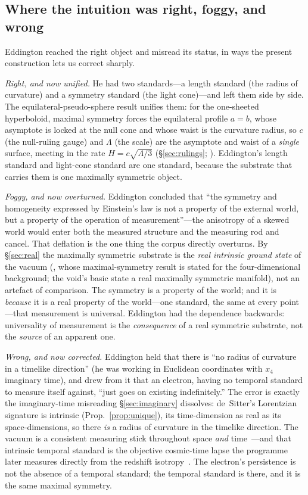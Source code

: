 \documentclass[11pt,a4paper]{article}
\theoremstyle{definition}
\begin{document}
\subsection{Where the intuition was right, foggy, and wrong}

Eddington reached the right object and misread its status, in ways the
present construction lets us correct sharply.

\emph{Right, and now unified.} He had two standards---a length standard (the
radius of curvature) and a symmetry standard (the light cone)---and left
them side by side. The equilateral-pseudo-sphere result unifies them: for
the one-sheeted hyperboloid, maximal symmetry forces the equilateral
profile $a=b$, whose asymptote is locked at the null cone and whose waist is
the curvature radius, so $c$ (the null-ruling gauge) and $\Lambda$ (the
scale) are the asymptote and waist of a \emph{single} surface, meeting in
the rate $H=c\sqrt{\Lambda/3}$ (\S\ref{sec:rulings};
\cite{JanzenCRframework}). Eddington's length standard and light-cone standard
are one standard, because the substrate that carries them is one
maximally symmetric object.

\emph{Foggy, and now overturned.} Eddington concluded that ``the symmetry
and homogeneity expressed by Einstein's law is not a property of the
external world, but a property of the operation of measurement''---the
anisotropy of a skewed world would enter both the measured structure and
the measuring rod and cancel. That deflation is the one thing the corpus
directly overturns. By \S\ref{sec:real} the maximally symmetric substrate
is the \emph{real intrinsic ground state} of the vacuum
(\cite{JanzenThesis}, whose maximal-symmetry result is stated for the
four-dimensional background; the void's basic state a real maximally
symmetric manifold), not an artefact of comparison. The symmetry
is a property of the world; and it is \emph{because} it is a real property
of the world---one standard, the same at every point---that measurement is
universal. Eddington had the dependence backwards: universality of
measurement is the \emph{consequence} of a real symmetric substrate, not the
\emph{source} of an apparent one.

\emph{Wrong, and now corrected.} Eddington held that there is ``no radius of
curvature in a timelike direction'' (he was working in Euclidean
coordinates with $x_4$ imaginary time), and drew from it that an electron,
having no temporal standard to measure itself against, ``just goes on
existing indefinitely.'' The error is exactly the imaginary-time misreading
\S\ref{sec:imaginary} dissolves: de~Sitter's Lorentzian signature is
intrinsic (Prop.~\ref{prop:unique}), its time-dimension as real as its
space-dimensions, so there \emph{is} a radius of curvature in the timelike
direction. The vacuum is a consistent measuring stick throughout space
\emph{and} time~\cite{JanzenThesis}---and that intrinsic temporal standard
is the objective cosmic-time lapse the programme later measures directly
from the redshift isotropy~\cite{JanzenModernParallax}. The electron's persistence
is not the absence of a temporal standard; the temporal standard is there,
and it is the same maximal symmetry.
\end{document}
